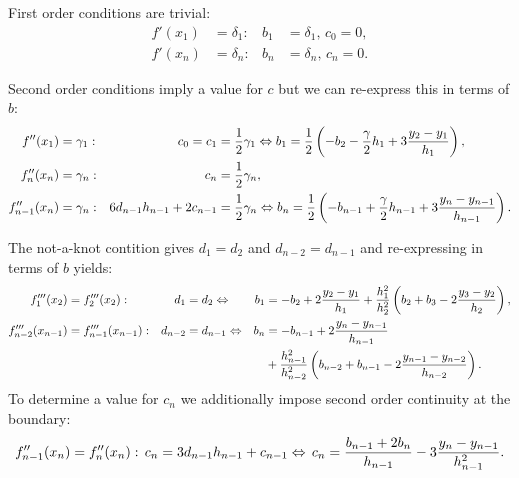 First order conditions are trivial:
\begin{equation*}
\begin{aligned}
    f'(x_1)&=\delta_1: & b_1 & = \delta_1,\, c_0 = 0,\\
    f'(x_n)&=\delta_n: & b_n & = \delta_n,\, c_n = 0.
\end{aligned}
\end{equation*}

Second order conditions imply a value for $c$ but we can re-express
this in terms of $b$:
\begin{equation*}
\begin{aligned}
    f''(x_1)&=\gamma_1: & c_0 = c_1 &= \frac{1}{2}\gamma_1 \Leftrightarrow
        b_1 = \frac{1}{2}\left(-b_2 -\frac{\gamma}{2} h_1
            + 3 \frac{y_2-y_1}{h_1}\right),\\
    f_n''(x_n)&=\gamma_n: & c_n &= \frac{1}{2}\gamma_n,\\
            f_{n-1}''(x_n)&=\gamma_n: & 6 d_{n-1}h_{n-1} + 2 c_{n-1} &= \frac{1}{2}\gamma_n \Leftrightarrow
            b_n = \frac{1}{2}\left(-b_{n-1} +\frac{\gamma}{2} h_{n-1}
            + 3 \frac{y_n-y_{n-1}}{h_{n-1}}\right).\\
\end{aligned}
\end{equation*}

The not-a-knot contition gives $d_1=d_2$ and $d_{n-2}=d_{n-1}$ and
re-expressing in terms of $b$ yields:
\begin{equation*}
\begin{aligned}
    f_1'''(x_2)&=f_2'''(x_2): & d_1&=d_2 \Leftrightarrow &
    b_1 & = -b_2+2\frac{y_2-y_1}{h_1}+\frac{h_1^2}{h_2^2}
        \left(b_2+b_3-2\frac{y_3-y_2}{h_2}\right),\\
    f_{n-2}'''(x_{n-1})&=f_{n-1}'''(x_{n-1}): & d_{n-2}&=d_{n-1}\Leftrightarrow&
    b_n & = -b_{n-1}+2\frac{y_n-y_{n-1}}{h_{n-1}}\\
        & & & & & +\frac{h_{n-1}^2}{h_{n-2}^2}
        \left(b_{n-2}+b_{n-1}-2\frac{y_{n-1}-y_{n-2}}{h_{n-2}}\right).
\end{aligned}
\end{equation*}
To determine a value for $c_n$ we additionally impose second order
continuity at the boundary:
\begin{equation*}
    f_{n-1}''(x_n)=f_n''(x_n): \, c_n =3d_{n-1}h_{n-1}+c_{n-1} \Leftrightarrow\,
        c_n=\frac{b_{n-1}+2 b_n}{h_{n-1}}-3\frac{y_n-y_{n-1}}{h_{n-1}^2}.
\end{equation*}

